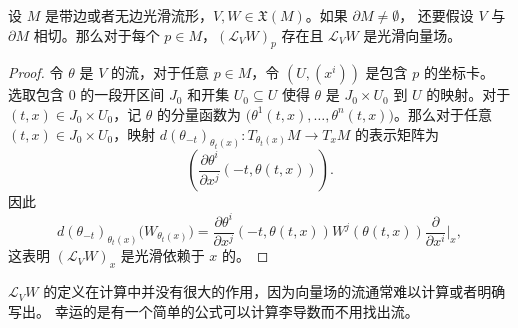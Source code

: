 \begin{lemma}\label{lemma:lie derivation is smooth}
  设 $M$ 是带边或者无边光滑流形，$V,W\in \mathfrak X(M)$。如果 $\partial M\neq\emptyset$，
  还要假设 $V$ 与 $\partial M$ 相切。那么对于每个 $p\in M$，$(\mathcal L_VW)_p$ 存在且
  $\mathcal L_VW$ 是光滑向量场。
\end{lemma}
\begin{proof}
  令 $\theta$ 是 $V$ 的流，对于任意 $p\in M$，令 $(U,(x^i))$ 是包含 $p$ 的坐标卡。
  选取包含 $0$ 的一段开区间 $J_0$ 和开集 $U_0\subseteq U$ 使得 $\theta$
  是 $J_0\times U_0$ 到 $U$ 的映射。对于 $(t,x)\in J_0\times U_0$，记 $\theta$
  的分量函数为 $\bigl(\theta^1(t,x),\dots,\theta^n(t,x)\bigr)$。那么对于任意
  $(t,x)\in J_0\times U_0$，映射 $d(\theta_{-t})_{\theta_t(x)}:T_{\theta_t(x)}M\to T_{x}M$
  的表示矩阵为
  \[
    \left(\frac{\partial \theta^i}{\partial x^j}(-t,\theta(t,x))\right).
  \]
  因此
  \[
    d(\theta_{-t})_{\theta_t(x)}\bigl(W_{\theta_t(x)}\bigr)
    =\frac{\partial \theta^i}{\partial x^j}(-t,\theta(t,x))W^j(\theta(t,x))
    \frac{\partial}{\partial x^i}\bigg|_{x},
  \]
  这表明 $(\mathcal L_VW)_x$ 是光滑依赖于 $x$ 的。
\end{proof}

$\mathcal L_VW$ 的定义在计算中并没有很大的作用，因为向量场的流通常难以计算或者明确写出。
幸运的是有一个简单的公式可以计算李导数而不用找出流。


